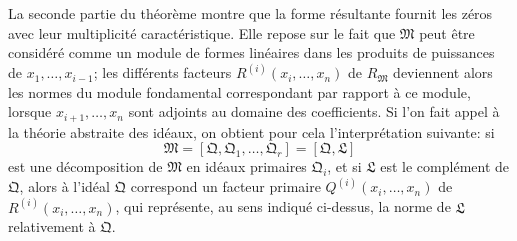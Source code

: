 La seconde partie du théorème montre que la forme résultante fournit les zéros avec leur multiplicité caractéristique. Elle repose sur le fait que $\mathfrak M$ peut être considéré comme un module de formes linéaires dans les produits de puissances de $x_1,\ldots,x_{i-1}$; les différents facteurs $R^{(i)}(x_i,\ldots,x_n)$ de $R_{\mathfrak M}$ deviennent alors les normes du \og{}module fondamental\fg{} correspondant par rapport à ce module, lorsque $x_{i+1},\ldots,x_n$ sont adjoints au domaine des coefficients. Si l'on fait appel à la théorie abstraite des idéaux, on obtient pour cela l'interprétation suivante: si
\[
 \mathfrak M=[\mathfrak Q,\mathfrak Q_1,\ldots,\mathfrak Q_r]=[\mathfrak Q,\mathfrak L]
\]
est une décomposition de $\mathfrak M$ en idéaux primaires $\mathfrak Q_i$, et si $\mathfrak L$ est le complément de $\mathfrak Q$, alors à l'idéal $\mathfrak Q$ correspond un facteur primaire $Q^{(i)}(x_i,\ldots,x_n)$ de $R^{(i)}(x_i,\ldots,x_n)$, qui représente, au sens indiqué ci-dessus, la norme de $\mathfrak L$ relativement à $\mathfrak Q$.
